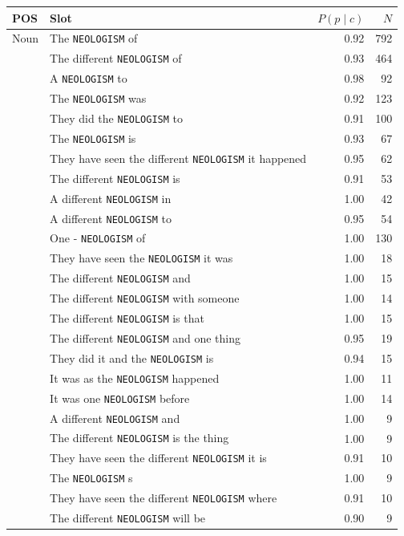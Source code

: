 \begin{table}[t]
\centering\small
\begin{tabular}{llrr}
\toprule
\textbf{POS} & \textbf{Slot} & $P(p\mid c)$ & $N$ \\
\midrule
Noun & The \texttt{NEOLOGISM} of & 0.92 & 792 \\
 & The different \texttt{NEOLOGISM} of & 0.93 & 464 \\
 & A \texttt{NEOLOGISM} to & 0.98 & 92 \\
 & The \texttt{NEOLOGISM} was & 0.92 & 123 \\
 & They did the \texttt{NEOLOGISM} to & 0.91 & 100 \\
 & The \texttt{NEOLOGISM} is & 0.93 & 67 \\
 & They have seen the different \texttt{NEOLOGISM} it happened & 0.95 & 62 \\
 & The different \texttt{NEOLOGISM} is & 0.91 & 53 \\
 & A different \texttt{NEOLOGISM} in & 1.00 & 42 \\
 & A different \texttt{NEOLOGISM} to & 0.95 & 54 \\
 & One - \texttt{NEOLOGISM} of & 1.00 & 130 \\
 & They have seen the \texttt{NEOLOGISM} it was & 1.00 & 18 \\
 & The different \texttt{NEOLOGISM} and & 1.00 & 15 \\
 & The different \texttt{NEOLOGISM} with someone & 1.00 & 14 \\
 & The different \texttt{NEOLOGISM} is that & 1.00 & 15 \\
 & The different \texttt{NEOLOGISM} and one thing & 0.95 & 19 \\
 & They did it and the \texttt{NEOLOGISM} is & 0.94 & 15 \\
 & It was as the \texttt{NEOLOGISM} happened & 1.00 & 11 \\
 & It was one \texttt{NEOLOGISM} before & 1.00 & 14 \\
 & A different \texttt{NEOLOGISM} and & 1.00 & 9 \\
 & The different \texttt{NEOLOGISM} is the thing & 1.00 & 9 \\
 & They have seen the different \texttt{NEOLOGISM} it is & 0.91 & 10 \\
 & The \texttt{NEOLOGISM} s & 1.00 & 9 \\
 & They have seen the different \texttt{NEOLOGISM} where & 0.91 & 10 \\
 & The different \texttt{NEOLOGISM} will be & 0.90 & 9 \\

\end{tabular}
\end{table}
